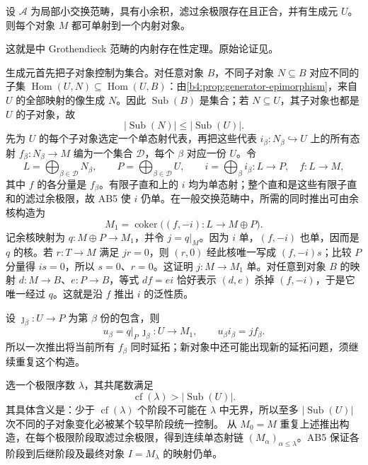 \begin{theorem}\label{b4:thm:grothendieck-enough-injectives}
	设 \(\mathcal A\) 为局部小交换范畴，具有小余积，滤过余极限存在且正合，并有生成元 \(U\)。则每个对象 \(M\) 都可单射到一个内射对象。
\end{theorem}
这就是中 Grothendieck 范畴的内射存在性定理。原始论证见\cite[Théorème 1.10.1, pp. 135--137]{Grothendieck1957TohokuI}。
\begin{proofsketch}
	生成元首先把子对象控制为集合。对任意对象 \(B\)，不同子对象 \(N\subseteq B\) 对应不同的子集 \(\operatorname{Hom}(U,N)\subseteq\operatorname{Hom}(U,B)\)：由\cref{b4:prop:generator-epimorphism}，来自 \(U\) 的全部映射的像生成 \(N\)。因此 \(\operatorname{Sub}(B)\) 是集合；若 \(N\subseteq U\)，其子对象也都是 \(U\) 的子对象，故
	\[
		|\operatorname{Sub}(N)|\le |\operatorname{Sub}(U)|.
	\]
	先为 \(U\) 的每个子对象选定一个单态射代表，再把这些代表 \(i_\beta:N_\beta\hookrightarrow U\) 上的所有态射 \(f_\beta:N_\beta\to M\) 编为一个集合 \(\mathcal D\)，每个 \(\beta\) 对应一份 \(U\)。令
	\[
		L=\bigoplus_{\beta\in\mathcal D}N_\beta,\qquad P=\bigoplus_{\beta\in\mathcal D}U,\qquad i=\bigoplus_\beta i_\beta:L\longrightarrow P, \quad f:L\longrightarrow M,
	\]
	其中 \(f\) 的各分量是 \(f_\beta\)。有限子直和上的 \(i\) 均为单态射；整个直和是这些有限子直和的滤过余极限，故 AB5 使 \(i\) 仍单。在一般交换范畴中，所需的同时推出可由余核构造为
	\[
		M_1=\operatorname{coker}\bigl((f,-i):L\longrightarrow M\oplus P\bigr).
	\]
	记余核映射为 \(q:M\oplus P\to M_1\)，并令 \(j=q|_M\)。因为 \(i\) 单，\((f,-i)\) 也单，因而是 \(q\) 的核。若 \(r:T\to M\) 满足 \(jr=0\)，则 \((r,0)\) 经此核唯一写成 \((f,-i)s\)；比较 \(P\) 分量得 \(is=0\)，所以 \(s=0\)、\(r=0\)。这证明 \(j:M\to M_1\) 单。对任意到对象 \(B\) 的映射 \(d:M\to B\)、\(e:P\to B\)，等式 \(df=ei\) 恰好表示 \((d,e)\) 杀掉 \((f,-i)\)，于是它唯一经过 \(q\)。这就是沿 \(f\) 推出 \(i\) 的泛性质。

	设 \(\jmath_\beta:U\to P\) 为第 \(\beta\) 份的包含，则
	\[
		u_\beta=q|_P\,\jmath_\beta:U\longrightarrow M_1, \qquad u_\beta i_\beta=jf_\beta.
	\]
	所以一次推出将当前所有 \(f_\beta\) 同时延拓；新对象中还可能出现新的延拓问题，须继续重复这个构造。

	选一个极限序数 \(\lambda\)，其共尾数满足
	\[
		\operatorname{cf}(\lambda)>|\operatorname{Sub}(U)|.
	\]
	其具体含义是：少于 \(\operatorname{cf}(\lambda)\) 个阶段不可能在 \(\lambda\) 中无界，所以至多 \(|\operatorname{Sub}(U)|\) 次不同的子对象变化必被某个较早阶段统一控制。 从 \(M_0=M\) 重复上述推出构造，在每个极限阶段取滤过余极限，得到连续单态射链 \((M_\alpha)_{\alpha\le\lambda}\)。AB5 保证各阶段到后继阶段及最终对象 \(I=M_\lambda\) 的映射仍单。


\end{proofsketch}
